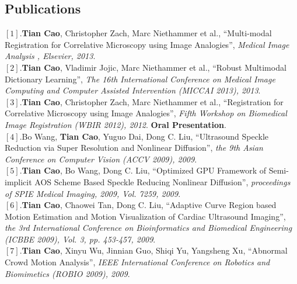 \documentclass[line,margin]{res}
\begin{document}
\begin{resume}
\section{\sc Publications}  
\smallskip
$[1]$.\textbf{Tian Cao}, Christopher Zach, Marc Niethammer et al., ``Multi-modal Registration for Correlative Microscopy using Image Analogies'', \emph{Medical Image Analysis
, Elsevier, 2013}. \vspace{.05in}\\
$[2]$.\textbf{Tian Cao}, Vladimir Jojic, Marc Niethammer et al., ``Robust Multimodal Dictionary Learning'', \emph{The 16th International Conference on Medical Image Computing and Computer Assisted Intervention (MICCAI 2013), 2013}. \vspace{.05in}\\ 
$[3]$.\textbf{Tian Cao}, Christopher Zach, Marc Niethammer et al., ``Registration for Correlative Microscopy using Image Analogies'',  \emph{Fifth Workshop on Biomedical Image Registration (WBIR 2012), 2012}. \textbf{Oral Presentation}.\vspace{.05in}\\%
$[4]$.Bo Wang, \textbf{Tian Cao}, Yuguo Dai, Dong C. Liu, ``Ultrasound Speckle Reduction via Super Resolution and Nonlinear Diffusion'',  \emph{the 9th Asian Conference on Computer Vision (ACCV 2009), 2009}. \vspace{.05in}\\
$[5]$.\textbf{Tian Cao}, Bo Wang, Dong C. Liu, ``Optimized GPU Framework of Semi-implicit AOS
Scheme Based Speckle Reducing Nonlinear Diﬀusion'',  \emph{proceedings of SPIE Medical Imaging, 2009, Vol. 7259, 2009}.\vspace{.05in}\\%
$[6]$.\textbf{Tian Cao}, Chaowei Tan, Dong C. Liu, ``Adaptive Curve Region based Motion Estimation and Motion Visualization of Cardiac Ultrasound Imaging'',  \emph{the 3rd International Conference on Bioinformatics and Biomedical Engineering (ICBBE 2009), Vol. 3, pp. 453-457, 2009}.\vspace{.05in}\\
$[7]$.\textbf{Tian Cao}, Xinyu Wu, Jinnian Guo, Shiqi Yu, Yangsheng Xu, ``Abnormal Crowd Motion Analysis'', \emph{IEEE International Conference on Robotics and Biomimetics (ROBIO 2009), 2009}.

%
 

\end{resume}
\end{document}
